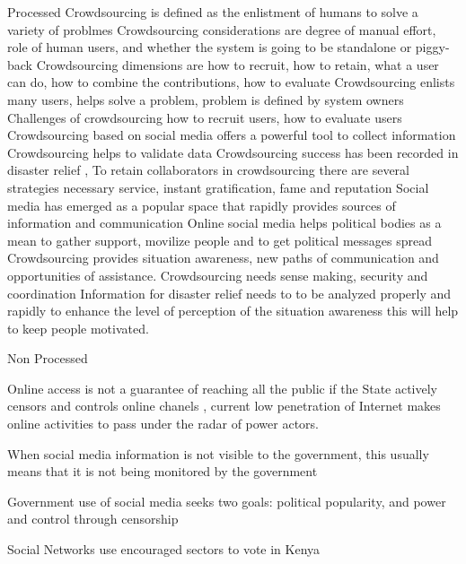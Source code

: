 Processed
Crowdsourcing is defined as the enlistment of humans to solve a variety of problmes \citep{doan2011}
Crowdsourcing considerations  are degree of manual effort, role of human users, and whether the system is going to be standalone or piggy-back \citep{doan2011}
Crowdsourcing dimensions are how to recruit, how to retain, what a user can do, how to combine the contributions, how to evaluate \citep{doan2011}
Crowdsourcing enlists many users, helps solve a problem, problem is defined by system owners \citep{doan2011}
Challenges of crowdsourcing how to recruit users, how to evaluate users \citep{doan2011}
Crowdsourcing based on social media offers a powerful tool to collect information \citep{gao2011}
Crowdsourcing helps to validate data \citep{gao2011}
Crowdsourcing success has been recorded in disaster relief \citep{yin2012}, 
To retain collaborators in crowdsourcing there are several strategies necessary service, instant gratification, fame and reputation \citep{doan2011}
Social media has emerged as a popular space that rapidly provides sources of information and communication \citep{yin2012}
Online social media helps political bodies as a mean to gather support, movilize people and to get political messages spread \citep{map2014}
Crowdsourcing provides situation awareness, new paths of communication and opportunities of assistance. Crowdsourcing needs sense making, security and coordination \citep{gao2011}
Information for disaster relief needs to to be analyzed properly and rapidly to enhance the level of perception of the situation awareness \citep{yin2012} this will help to keep people motivated.



Non Processed

Online access is not a guarantee of reaching all the public if the State actively censors and controls online chanels \citep{map2014}, current low penetration of Internet makes online activities to pass under the radar of power actors.

When social media information is not visible to the government, this usually means that it is not being monitored by the government \citep{yin2012}

Government use of social media seeks two goals:  political popularity, and power and control through censorship \citep{saadia2014}

Social Networks use encouraged sectors to vote in Kenya \citep{map2014}
